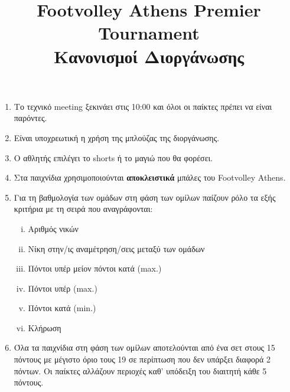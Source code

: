 \documentclass[a4paper,11pt]{article}
\title{Footvolley Athens Premier Tournament \\ Κανονισμοί Διοργάνωσης}
\date{}
\begin{document}
\maketitle
\thispagestyle{fancy}

\vspace{-3cm}

\begin{enumerate}

\item Το τεχνικό meeting ξεκινάει στις 10:00 και όλοι οι παίκτες πρέπει να είναι
  παρόντες.

\item Είναι υποχρεωτική η χρήση της μπλούζας της διοργάνωσης.

\item Ο αθλητής επιλέγει το shorts ή το μαγιώ που θα φορέσει.

\item Στα παιχνίδια χρησιμοποιούνται \textbf{αποκλειστικά} μπάλες του Footvolley
  Athens.




\item Για τη βαθμολογία των ομάδων στη φάση των ομίλων παίζουν ρόλο τα εξής
  κριτήρια με τη σειρά που αναγράφονται:

  \begin{enumerate}[i)]
  \item Αριθμός νικών
  \item Νίκη στην/ις αναμέτρηση/σεις μεταξύ των ομάδων
  \item Πόντοι υπέρ μείον πόντοι κατά (max.)
  \item Πόντοι υπέρ (max.)
  \item Πόντοι κατά (min.)
  \item Κλήρωση %
  \end{enumerate}

\item Όλα τα παιχνίδια στη φάση των ομίλων αποτελούνται από ένα σετ στους 15
  πόντους με μέγιστο όριο τους 19 σε περίπτωση που δεν υπάρξει διαφορά 2 πόντων.
  Οι παίκτες αλλάζουν περιοχές καθ' υπόδειξη του διαιτητή κάθε 5 πόντους.


\end{enumerate}
\end{document}
